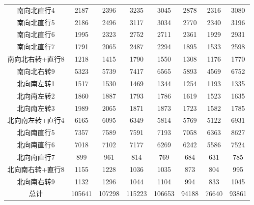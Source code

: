 \documentclass[UTF8]{article}
\begin{document}
\begin{table}[H]
\begin{tabular}{cccccccc}
            南向北直行4	&2187	&2396	&3235	&3045	&2878	&2316	&3080\\
           
            南向北直行5	&2186	&2496	&3117	&3034	&2770	&2340	&3196\\
           
            南向北直行6	&1995	&2323	&2752	&2711	&2361	&1929	&2931\\
           
            南向北直行7	&1791	&2065	&2487	&2294	&1895	&1533	&2598\\
           
            南向北右转+直行8	&1218	&1415	&1790	&1550	&1308	&1176	&1770\\
                       
            南向北右转9	&5323	&5739	&7417	&6565	&5893	&4569	&6752\\
           
            北向南左转1	&1517	&1530	&1469	&1344	&1254	&1193	&1335\\
           
            北向南左转2	&1860	&1887	&1793	&1786	&1619	&1523	&1635\\
           
            北向南左转3	&1989	&2065	&1871	&1873	&1723	&1582	&1785\\
           
            北向南左转+直行4	&6165	&6095	&6349	&5814	&5769	&5122	&6931\\
           
            北向南直行5	&7357	&7589	&7591	&7193	&7058	&6363	&8627\\
           
            北向南直行6	&7018	&7102	&7177	&6269	&6242	&5586	&7524\\
           
            北向南直行7	&899	&961	&814	&769	&684	&631	&785\\
           
            北向南右转+直行8	&1155	&1228	&1036	&1035	&873	&804	&995\\
           
            北向南右转9	&1132	&1296	&1044	&1104	&994	&833	&1045\\
           
            总计	&105641	&107298	&115223	&106653	&94188	&76640	&93861\\
           \hline
            
        \end{tabular}
    \end{table}
\end{document}
